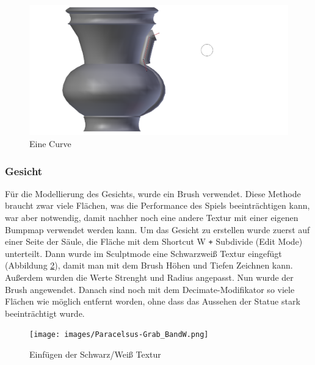 \begin{figure}[h]
    \centering
    \includegraphics[width=.8\textwidth]{images/Paracelsus-Grab_Vase-Curve.png}
    \caption{Eine Curve}
    \label{Paracelsus_Grab:image5}
\end{figure}

\subsubsection{Gesicht}
Für die Modellierung des Gesichts, wurde ein Brush verwendet. Diese Methode braucht zwar viele Flächen, was die Performance des Spiels beeinträchtigen kann, war
aber notwendig, damit nachher noch eine andere Textur mit einer eigenen Bumpmap verwendet werden kann. Um das Gesicht zu erstellen wurde zuerst auf einer Seite der Säule,
die Fläche mit dem Shortcut W \verb-+- Subdivide (Edit Mode) unterteilt. Dann wurde im Sculptmode eine Schwarzweiß Textur eingefügt (Abbildung \ref{Paracelsus_Grab:image4}),
damit man mit dem Brush Höhen und Tiefen Zeichnen kann. Außerdem wurden die Werte Strenght und Radius angepasst. Nun wurde der Brush angewendet. Danach sind noch mit dem
Decimate-Modifikator so viele Flächen wie möglich entfernt worden, ohne dass das Aussehen der Statue stark beeinträchtigt wurde.

\begin{figure}[h]
    \centering
    \texttt{[image: images/Paracelsus-Grab\_BandW.png]}
    \caption{Einfügen der Schwarz/Weiß Textur}
    \label{Paracelsus_Grab:image4}
\end{figure}

